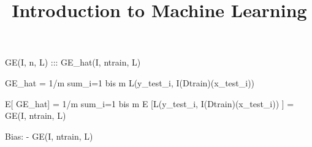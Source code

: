 





\newcommand{\titlefigure}{figure_man/crossvalidation}
\newcommand{\learninggoals}{
\item Understand advantages of subsampling over single hold-out split
\item Understand challenges when comparing learners based on CV results
\item Understand what pessimistic bias means
\item Be able to compare different resampling strategies}


\title{Introduction to Machine Learning}
\date{}



\sloppy


GE(I, n, L) ::: GE_hat(I, ntrain, L)


GE_hat = 1/m sum_{i=1 bis m} L(y_test_i, I(Dtrain)(x_test_i))

E[ GE_hat] = 1/m sum_{i=1 bis m} E [L(y_test_i, I(Dtrain)(x_test_i)) ] = GE(I, ntrain, L)

Bias: - GE(I, ntrain, L)


